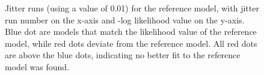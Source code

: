 \documentclass[
]{scrartcl}
\begin{document}
\begin{figure}[H]


\caption{\label{fig-jitter001}Jitter runs (using a value of 0.01) for
the reference model, with jitter run number on the x-axis and -log
likelihood value on the y-axis. Blue dot are models that match the
likelihood value of the reference model, while red dots deviate from the
reference model. All red dots are above the blue dots, indicating no
better fit to the reference model was found.}

\end{figure}%
\end{document}
